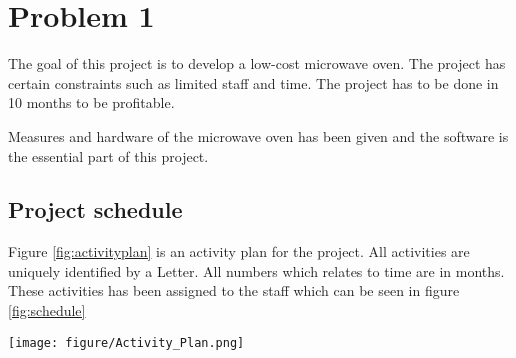 \chapter{Problem 1}
\label{chp:intro}

The goal of this project is to develop a low-cost microwave oven. 
The project has certain constraints such as limited staff and time. The project has to be done in 10 months to be profitable. 

Measures and hardware of the microwave oven has been given and the software is the essential part of this project.

\section{Project schedule}
Figure \ref{fig:activityplan} is an activity plan for the project. All activities are uniquely identified by a Letter. All numbers which relates to time are in months. These activities has been assigned to the staff which can be seen in figure \ref{fig:schedule} 
\begin{sidewaysfigure}
	\centering 
	\texttt{[image: figure/Activity\_Plan.png]} 
	\caption{Activity Plan} 
	\label{fig:activityplan}
\end{sidewaysfigure}
